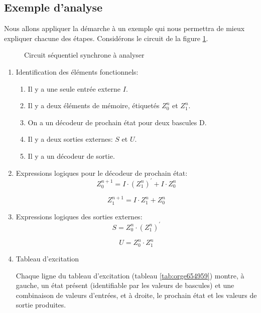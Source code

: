 \documentclass[11pt]{article}
\begin{document}
\subsection{Exemple d'analyse}
\label{sec:org9c6bef9}

Nous allons appliquer la démarche à un exemple qui nous permettra de
mieux expliquer chacune des étapes. Considérons le circuit de la
figure \ref{fig:org91fd7d4}.

\begin{figure}[htbp]
\centering

\caption{\label{fig:org91fd7d4}Circuit séquentiel synchrone à analyser}
\end{figure}

\begin{enumerate}
\item Identification des éléments fonctionnels:

\begin{enumerate}
\item Il y a une seule entrée externe \(I\).
\item Il y a deux éléments de mémoire, étiquetés \(Z_0^n\) et  \(Z_1^n\).
\item On a un décodeur de prochain état pour deux bascules D.
\item Il y a deux sorties externes: \(S\) et \(U\).
\item Il y a un décodeur de sortie.
\end{enumerate}

\item Expressions logiques pour le décodeur de prochain état: 
$$ Z_0^{n+1} = I \cdot (Z_1^n)^\prime  + I \cdot Z_0^n $$

$$ Z_1^{n+1} = I \cdot Z_1^n +  Z_0^n  $$

\item Expressions logiques des sorties externes:
$$ S =  Z_0^n \cdot (Z_1^{n})^\prime $$

$$ U =  Z_0^n \cdot Z_1^{n} $$

\item Tableau d'excitation

Chaque ligne du tableau d'excitation (tableau \ref{tab:orge654959}) montre, à gauche,
un état présent (identifiable par les valeurs de bascules) et une
combinaison de valeurs d'entrées, et à droite, le prochain état et les
valeurs de sortie produites.


\end{enumerate}
\end{document}

